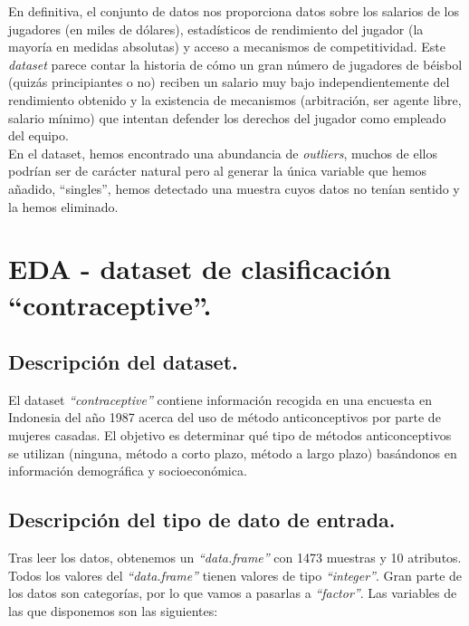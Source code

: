 \documentclass[a4paper,12pt, oneside]{book}
\begin{document}
En definitiva, el conjunto de datos nos proporciona datos sobre los salarios de los jugadores (en miles de dólares), estadísticos de rendimiento del jugador (la mayoría en medidas absolutas) y acceso a mecanismos de competitividad. Este \textit{dataset} parece contar la historia de cómo un gran número de jugadores de béisbol (quizás principiantes o no) reciben un salario muy bajo independientemente del rendimiento obtenido y la existencia de mecanismos (arbitración, ser agente libre, salario mínimo) que intentan defender los derechos del jugador como empleado del equipo.\\

En el dataset, hemos encontrado una abundancia de \textit{outliers}, muchos de ellos podrían ser de carácter natural pero al generar la única variable que hemos añadido, ``singles'', hemos detectado una muestra cuyos datos no tenían sentido y la hemos eliminado.

\newpage
\section{EDA - dataset de clasificación ``contraceptive''.}
\subsection{Descripción del dataset.}
El dataset \textit{``contraceptive''} contiene información recogida en una encuesta en Indonesia del año 1987 acerca del uso de método anticonceptivos por parte de mujeres casadas. El objetivo es determinar qué tipo de métodos anticonceptivos se utilizan (ninguna, método a corto plazo, método a largo plazo) basándonos en información demográfica y socioeconómica.
\subsection{Descripción del tipo de dato de entrada.}
Tras leer los datos, obtenemos un \textit{``data.frame''} con 1473 muestras y 10 atributos. Todos los valores del \textit{``data.frame''} tienen valores de tipo \textit{``integer''}. Gran parte de los datos son categorías, por lo que vamos a pasarlas a \textit{``factor''}. Las variables de las que disponemos son las siguientes:
\end{document}
